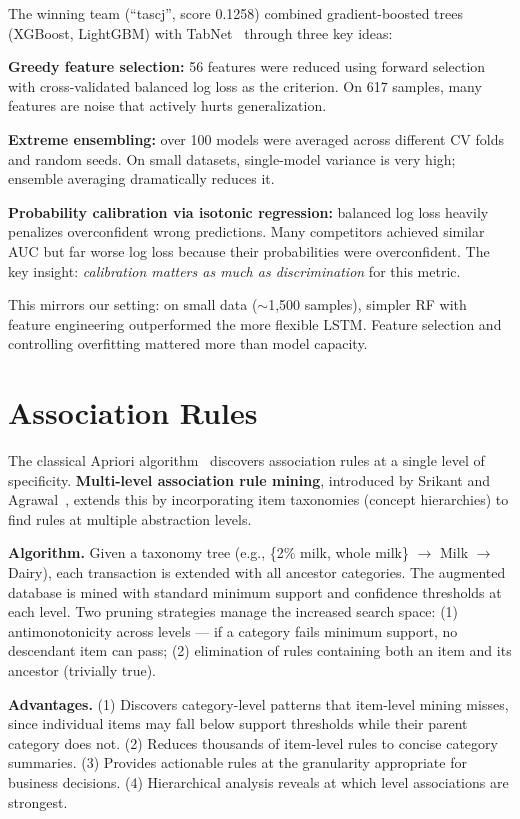 \documentclass[runningheads]{llncs}
\begin{document}
The winning team (``tascj'', score 0.1258) combined gradient-boosted trees (XGBoost, LightGBM) with TabNet~\cite{arik2021} through three key ideas:

\textbf{Greedy feature selection:} 56 features were reduced using forward selection with cross-validated balanced log loss as the criterion. On 617 samples, many features are noise that actively hurts generalization.

\textbf{Extreme ensembling:} over 100 models were averaged across different CV folds and random seeds. On small datasets, single-model variance is very high; ensemble averaging dramatically reduces it.

\textbf{Probability calibration via isotonic regression:} balanced log loss heavily penalizes overconfident wrong predictions. Many competitors achieved similar AUC but far worse log loss because their probabilities were overconfident. The key insight: \emph{calibration matters as much as discrimination} for this metric.

This mirrors our setting: on small data ($\sim$1,500 samples), simpler RF with feature engineering outperformed the more flexible LSTM. Feature selection and controlling overfitting mattered more than model capacity.

\section{Association Rules}

The classical Apriori algorithm~\cite{agrawal1994} discovers association rules at a single level of specificity. \textbf{Multi-level association rule mining}, introduced by Srikant and Agrawal~\cite{srikant1995}, extends this by incorporating item taxonomies (concept hierarchies) to find rules at multiple abstraction levels.

\textbf{Algorithm.} Given a taxonomy tree (e.g., \{2\% milk, whole milk\} $\to$ Milk $\to$ Dairy), each transaction is extended with all ancestor categories. The augmented database is mined with standard minimum support and confidence thresholds at each level. Two pruning strategies manage the increased search space: (1) antimonotonicity across levels --- if a category fails minimum support, no descendant item can pass; (2) elimination of rules containing both an item and its ancestor (trivially true).

\textbf{Advantages.} (1) Discovers category-level patterns that item-level mining misses, since individual items may fall below support thresholds while their parent category does not. (2) Reduces thousands of item-level rules to concise category summaries. (3) Provides actionable rules at the granularity appropriate for business decisions. (4) Hierarchical analysis reveals at which level associations are strongest.
\end{document}
